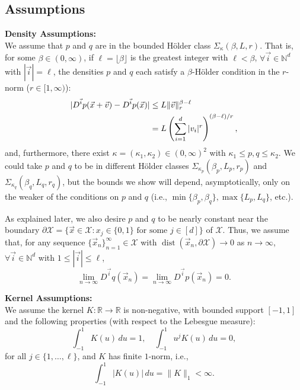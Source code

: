 \documentclass{article}
\newcommand{\N}{\mathbb{N}}                         %
\newcommand{\R}{\mathbb{R}}                         %
\newcommand{\X}{\mathcal{X}}                        %
\newcommand{\vx}{\vec{x}}                           %
\newcommand{\vv}{\vec{v}}                           %
\newcommand{\vi}{{\vec{i}}}                         %
\newcommand{\dist}{\operatorname{dist}}             %
\begin{document}
\subsection{Assumptions}
\label{sec:Assumptions}
{\bf Density Assumptions:}\\
We assume that $p$ and $q$ are in the bounded H\"{o}lder class
$\Sigma_\kappa(\beta,L,r)$. That is, for some $\beta \in (0,\infty)$,
if $\ell = \lfloor \beta \rfloor$ is the greatest integer with
$\ell < \beta$, $\forall \vi \in \N^d$ with $|\vi| = \ell$,
the densities $p$ and $q$ each satisfy a $\beta$-H\"{o}lder condition in the
$r$-norm ($r \in [1,\infty)$):
\begin{align}
\notag
|D^\vi p(\vx + \vv) - D^\vi p(\vx)|
 &  \leq L\|\vv\|_r^{\beta - \ell}    \\
\label{ineq:holder_cond}
 &  = L\left( \sum_{i = 1}^d |v_i|^r \right)^{(\beta-\ell)/r},
\end{align}
and, furthermore, there exist $\kappa = (\kappa_1,\kappa_2) \in (0,\infty)^2$
with $\kappa_1 \leq p,q \leq \kappa_2$. We could take $p$ and $q$ to be in
different H\"{o}lder classes $\Sigma_{\kappa_p}(\beta_p,L_p,r_p)$
and $\Sigma_{\kappa_q}(\beta_q,L_q,r_q)$, but the bounds we show will depend,
asymptotically, only on the weaker of the conditions on $p$ and $q$ (i.e.,
$\min\{\beta_p,\beta_q\}, \max\{L_p,L_q\}$, etc.).

As explained later, we also desire $p$ and $q$ to be nearly constant near the
boundary
$\partial \X = \{\vx \in \X : x_j \in \{0,1\} \mbox{ for some } j \in [d]\}$ of
$\X$. Thus, we assume that, for any sequence
$\{\vx_n\}_{n = 1}^\infty \in \X$ with $\dist(\vx_n,\partial \X) \to 0$ as
$n \to \infty$, $\forall \vi \in \N^d$ with $1 \leq |\vi| \leq \ell$,
\[
\lim_{n \to \infty} D^\vi q(\vx_n) = \lim_{n \to \infty} D^\vi p(\vx_n) = 0.
\]

{\bf Kernel Assumptions:}\\
We assume the kernel $K : \R \to \R$ is non-negative, with bounded support
$[-1,1]$ and the following properties (with respect to the Lebesgue measure):
\[\int_{-1}^1 K(u) \, du = 1, \quad \int_{-1}^1 u^jK(u) \, du = 0,
\]
for all $j \in \{1,\dots,\ell\}$, and $K$ has finite $1$-norm, i.e.,
\begin{equation}
\label{eq:k_int}
    \int_{-1}^1 |K(u)| \, du = \|K\|_1 < \infty.
\end{equation}
\end{document}
